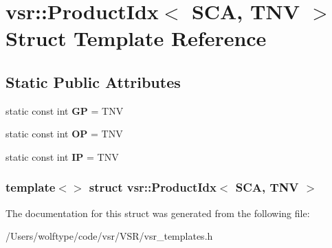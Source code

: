 \hypertarget{structvsr_1_1_product_idx_3_01_s_c_a_00_01_t_n_v_01_4}{\section{vsr\-:\-:Product\-Idx$<$ S\-C\-A, T\-N\-V $>$ Struct Template Reference}
\label{structvsr_1_1_product_idx_3_01_s_c_a_00_01_t_n_v_01_4}
}
\subsection*{Static Public Attributes}
\begin{DoxyCompactItemize}
\item 
\hypertarget{structvsr_1_1_product_idx_3_01_s_c_a_00_01_t_n_v_01_4_a48bba203f65991064bc62582c6b2dbda}{static const int {\bfseries G\-P} = T\-N\-V}\label{structvsr_1_1_product_idx_3_01_s_c_a_00_01_t_n_v_01_4_a48bba203f65991064bc62582c6b2dbda}

\item 
\hypertarget{structvsr_1_1_product_idx_3_01_s_c_a_00_01_t_n_v_01_4_a4e20ad655087b63aa1e3485d19e83d31}{static const int {\bfseries O\-P} = T\-N\-V}\label{structvsr_1_1_product_idx_3_01_s_c_a_00_01_t_n_v_01_4_a4e20ad655087b63aa1e3485d19e83d31}

\item 
\hypertarget{structvsr_1_1_product_idx_3_01_s_c_a_00_01_t_n_v_01_4_ae639c88859da2a8c3d19050fd0348afd}{static const int {\bfseries I\-P} = T\-N\-V}\label{structvsr_1_1_product_idx_3_01_s_c_a_00_01_t_n_v_01_4_ae639c88859da2a8c3d19050fd0348afd}

\end{DoxyCompactItemize}
\subsubsection*{template$<$$>$ struct vsr\-::\-Product\-Idx$<$ S\-C\-A, T\-N\-V $>$}



The documentation for this struct was generated from the following file\-:\begin{DoxyCompactItemize}
\item 
/\-Users/wolftype/code/vsr/\-V\-S\-R/vsr\-\_\-templates.\-h\end{DoxyCompactItemize}
